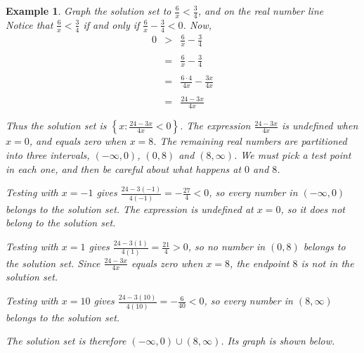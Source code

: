 \documentclass[11pt]{book}               %
\newtheorem{example}{Example}
\begin{document}
\begin{example}
 {Graph the solution set to $ \frac{6}{x} < \frac{3}{4} $, and on the real number line} \\
 
 \normalfont
Notice that  $ \frac{6}{x} < \frac{3}{4} $  if and only if 
$ \frac{6}{x} - \frac{3}{4} < 0 $.
Now,
    $$
    \begin{array}{rcl}
    0 & > & \frac{6}{x} - \frac{3}{4}\\ \\
        & = & \frac{6}{x} - \frac{3}{4}\\ \\
        & = & \frac{6\cdot4}{4x} - \frac{3x}{4x}\\ \\
        & = & \frac{24-3x}{4x}\\ \\ 
    \end{array}
    $$
Thus the solution set is $\left\{ x: \frac{24-3x}{4x} < 0\right\}$.
The expression $\frac{24-3x}{4x}$ is undefined when $x = 0$, and equals zero when $x = 8$.
The remaining real numbers are partitioned into three intervals, $(-\infty, 0)$, $(0, 8)$ and $(8, \infty)$.
We must pick a test point in each one, and then be careful about what happens at $0$ and $8$.

Testing with $x = -1$ gives  $\frac{24-3 (-1)}{4 (-1)} = -\frac{27}{4} < 0$, so every number in 
$(-\infty, 0)$ belongs to the solution set.
The expression is undefined at $x = 0$, so it does not belong to the solution set.

Testing with $x = 1$ gives $ \frac{24-3(1)}{4(1)} = \frac{21}{4} > 0$, so no number in
$(0, 8)$ belongs to the solution set.
Since $\frac{24-3x}{4x}$ equals zero when $x = 8$, the endpoint $8$ is not in the solution set.

Testing with $x = 10$ gives $ \frac{24-3(10)}{4(10)} = -\frac{6}{40} < 0$, so every number in 
$(8, \infty)$ belongs to the solution set.

The solution set is therefore $(-\infty, 0) \cup (8, \infty)$.  Its graph is shown below.


\begin{center}
\end{center}

\end{example}
\end{document}
